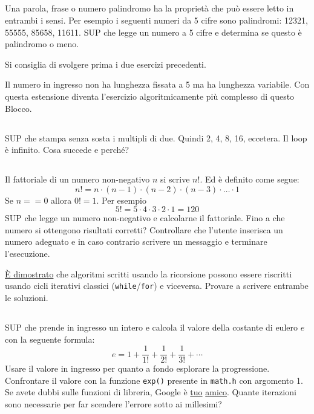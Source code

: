 \documentclass{article}
\begin{document}
\subsection{}
Una parola, frase o numero palindromo ha la proprietà che può essere letto in entrambi i sensi. Per esempio i seguenti numeri da 5 cifre sono palindromi: 12321, 55555, 85658, 11611. SUP che legge un numero a 5 cifre e determina se questo è palindromo o meno.
\begin{info} 
	Si consiglia di svolgere prima i due esercizi precedenti.
\end{info}
\begin{warn} [Estensione:]
	Il numero in ingresso non ha lunghezza fissata a 5 ma ha lunghezza variabile. Con questa estensione diventa l'esercizio algoritmicamente più complesso di questo Blocco.
\end{warn}

\subsection{}
SUP che stampa senza sosta i multipli di due. Quindi 2, 4, 8, 16, eccetera. Il loop è infinito. Cosa succede e perché?

\subsection{}
Il fattoriale di un numero non-negativo $n$ si scrive $n!$. Ed è definito come segue:
$$n! = n \cdot (n - 1) \cdot (n - 2) \cdot (n - 3) \cdot \ldots \cdot 1$$
Se $n==0$ allora $0! = 1$.
Per esempio $$5! = 5 \cdot 4 \cdot 3 \cdot 2 \cdot 1 = 120$$
SUP che legge un numero non-negativo e calcolarne il fattoriale. Fino a che numero si ottengono risultati corretti? Controllare che l'utente inserisca un numero adeguato e in caso contrario scrivere un messaggio e terminare l'esecuzione. 
\begin{info} 
	\href{https://en.wikipedia.org/wiki/Recursion_(computer_science)#Recursion_versus_iteration}{È dimostrato} che algoritmi scritti usando la ricorsione possono essere riscritti usando cicli iterativi classici (\texttt{while}/\texttt{for}) e viceversa. Provare a scrivere entrambe le soluzioni.
\end{info}


\subsection{}
SUP che prende in ingresso un intero e calcola il valore della costante di eulero $e$ con la seguente formula:
$$e = 1 + \frac{1}{1!} + \frac{1}{2!} + \frac{1}{3!} + \cdots$$
Usare il valore in ingresso per quanto a fondo esplorare la progressione. Confrontare il valore con la funzione \texttt{exp()} presente in \texttt{math.h} con argomento 1. Se avete dubbi sulle funzioni di libreria, Google è \href{http://www.cplusplus.com/reference/cmath/exp/}{tuo} \href{https://www.geeksforgeeks.org/exp-function-cpp/}{amico}. Quante iterazioni sono necessarie per far scendere l'errore sotto ai millesimi?
\end{document}

